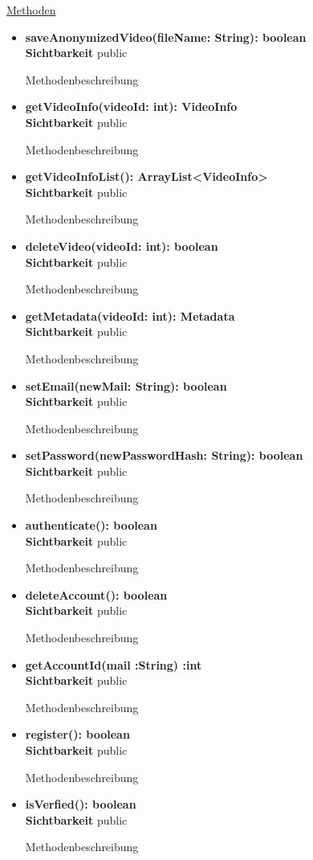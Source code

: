 \underline{Methoden}
\begin{itemize}
\itemsep0pt
\item \textbf{saveAnonymizedVideo(fileName: String): boolean}\hfill\\
\textbf{Sichtbarkeit} public

Methodenbeschreibung

\item \textbf{getVideoInfo(videoId: int): VideoInfo}\hfill\\
\textbf{Sichtbarkeit} public

Methodenbeschreibung

\item \textbf{getVideoInfoList(): ArrayList<VideoInfo>}\hfill\\
\textbf{Sichtbarkeit} public

Methodenbeschreibung
\item \textbf{deleteVideo(videoId: int): boolean}\hfill\\
\textbf{Sichtbarkeit} public

Methodenbeschreibung
\item \textbf{getMetadata(videoId: int): Metadata}\hfill\\
\textbf{Sichtbarkeit} public

Methodenbeschreibung
\item \textbf{setEmail(newMail: String): boolean}\hfill\\
\textbf{Sichtbarkeit} public

Methodenbeschreibung
\item \textbf{setPassword(newPasswordHash: String): boolean}\hfill\\
\textbf{Sichtbarkeit} public

Methodenbeschreibung
\item \textbf{authenticate(): boolean}\hfill\\
\textbf{Sichtbarkeit} public

Methodenbeschreibung
\item \textbf{deleteAccount(): boolean}\hfill\\
\textbf{Sichtbarkeit} public

Methodenbeschreibung
\item \textbf{getAccountId(mail :String) :int}\hfill\\
\textbf{Sichtbarkeit} public

Methodenbeschreibung
\item \textbf{register(): boolean}\hfill\\
\textbf{Sichtbarkeit} public

Methodenbeschreibung
\item \textbf{isVerfied(): boolean}\hfill\\
\textbf{Sichtbarkeit} public

Methodenbeschreibung

\end{itemize}